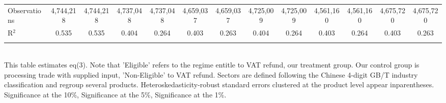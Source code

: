 \documentclass[preview]{standalone}
\begin{document}
\begin{table}[!htbp]
\begin{adjustbox}{width=\textwidth, totalheight=\baselineskip,keepaspectratio}
\begin{tabular}{@{\extracolsep{5pt}}lcccccccccccc}
Observations & 4,744,218 & 4,744,218 & 4,737,048 & 4,737,048 & 4,659,037 & 4,659,037 & 4,725,009 & 4,725,009 & 4,561,160 & 4,561,160 & 4,675,720 & 4,675,720 \\ 
R$^{2}$ & 0.535 & 0.535 & 0.404 & 0.264 & 0.403 & 0.263 & 0.404 & 0.264 & 0.403 & 0.264 & 0.403 & 0.263 \\ 
\hline 
\hline \\[-1.8ex] 
\end{tabular}
\end{adjustbox}
\begin{tablenotes} 
 \small 
 \item \\ 

This table estimates eq(3). 
Note that 'Eligible' refers to the regime entitle to VAT refund, our treatment group.
Our control group is processing trade with supplied input, 'Non-Eligible' to VAT refund.
Sectors are defined following the Chinese 4-digit GB/T industry
classification and regroup several products.
Heteroskedasticity-robust standard errors
clustered at the product level appear inparentheses.
\sym{*} Significance at the 10\%, \sym{**} Significance at the 5\%, \sym{***} Significance at the 1\%. 
\end{tablenotes}
\end{table}
\end{document}

